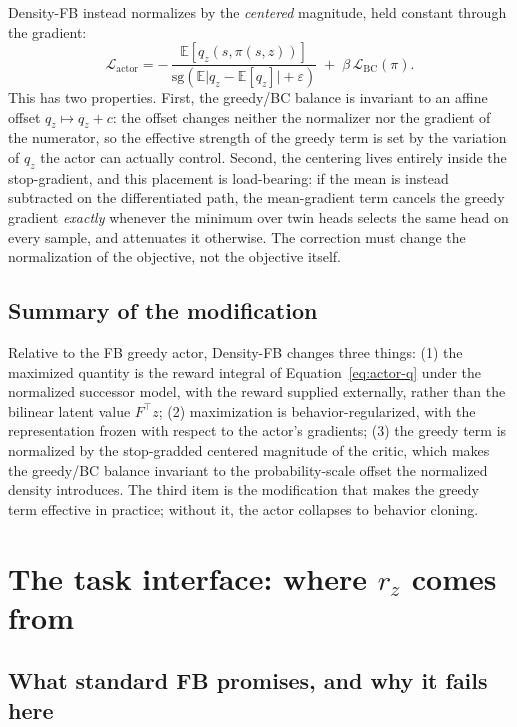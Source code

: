 \documentclass[11pt]{article}
\begin{document}
{Density-FB instead normalizes by the \emph{centered} magnitude, held constant through the gradient:
\begin{equation}
\boxed{
    \mathcal L_{\mathrm{actor}}
    =
    -\,
    \frac{
        \mathbb E\left[ q_z(s,\pi(s,z)) \right]
    }{
        \mathrm{sg}\!\left(
        \mathbb E\bigl| q_z - \mathbb E[q_z] \bigr| + \varepsilon
        \right)
    }
    \;+\;
    \beta\, \mathcal L_{\mathrm{BC}}(\pi).
}
\label{eq:actor-centered}
\end{equation}
This has two properties.
First, the greedy/BC balance is invariant to an affine offset $q_z \mapsto q_z + c$: the offset changes neither the normalizer nor the gradient of the numerator, so the effective strength of the greedy term is set by the variation of $q_z$ the actor can actually control.
Second, the centering lives entirely inside the stop-gradient, and this placement is load-bearing: if the mean is instead subtracted on the differentiated path, the mean-gradient term cancels the greedy gradient \emph{exactly} whenever the minimum over twin heads selects the same head on every sample, and attenuates it otherwise.
The correction must change the normalization of the objective, not the objective itself.

\subsection*{Summary of the modification}

Relative to the FB greedy actor, Density-FB changes three things:
(1) the maximized quantity is the reward integral of Equation~\eqref{eq:actor-q} under the normalized successor model, with the reward supplied externally, rather than the bilinear latent value $F^\top z$;
(2) maximization is behavior-regularized, with the representation frozen with respect to the actor's gradients;
(3) the greedy term is normalized by the stop-gradded centered magnitude of the critic, which makes the greedy/BC balance invariant to the probability-scale offset the normalized density introduces.
The third item is the modification that makes the greedy term effective in practice; without it, the actor collapses to behavior cloning.

\section{The task interface: where $r_z$ comes from}

\subsection*{What standard FB promises, and why it fails here}

}
\end{document}
